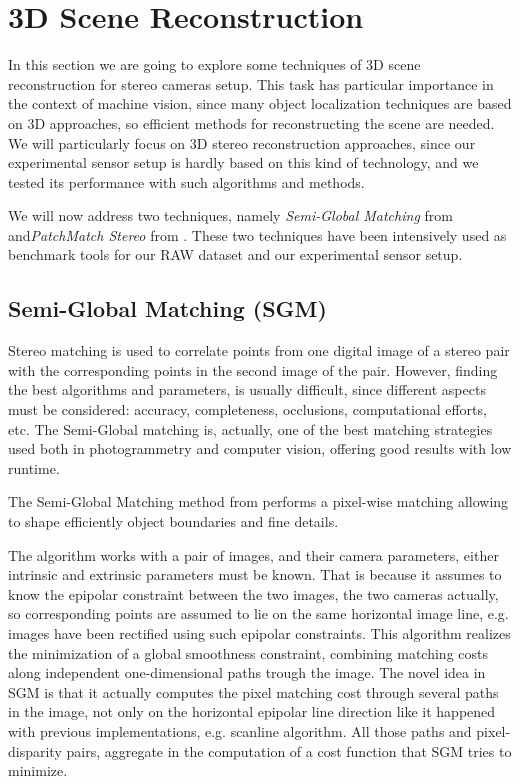 \section{3D Scene Reconstruction}\label{sec:3dreconstruction}
In this section we are going to explore some techniques of 3D scene reconstruction for stereo cameras setup. This task has particular importance in the context of machine vision, since many object localization techniques are based on 3D approaches, so efficient methods for reconstructing the scene are needed. We will particularly focus on 3D stereo reconstruction approaches, since our experimental sensor setup is hardly based on this kind of technology, and we tested its performance with such algorithms and methods.

We will now address two techniques, namely \emph{Semi-Global Matching} from \cite{hirschmuller2005SemiGlobal} and\emph{PatchMatch Stereo} from \cite{bleyer2011PatchMatchStereo}. These two techniques have been intensively used as benchmark tools for our RAW dataset and our experimental sensor setup.

\subsection{Semi-Global Matching (SGM)}\label{subsec:semiglobalmatching}
Stereo matching is used to correlate points from one digital image of a stereo pair with the corresponding points in the second image of the pair. However, finding the best algorithms and parameters, is usually difficult, since different aspects must be considered: accuracy, completeness, occlusions, computational efforts, etc. The Semi-Global matching is, actually, one of the best matching strategies used both in photogrammetry and computer vision, offering good results with low runtime.

The Semi-Global Matching method from \cite{hirschmuller2005SemiGlobal} performs a pixel-wise matching allowing to shape efficiently object boundaries and fine details. 

The algorithm works with a pair of images, and their camera parameters, either intrinsic and extrinsic parameters must be known. That is because it assumes to know the epipolar constraint between the two images, the two cameras actually, so corresponding points are assumed to lie on the same horizontal image line, e.g. images have been rectified using such epipolar constraints. This algorithm realizes the minimization of a global smoothness constraint, combining matching costs along independent one-dimensional paths trough the image. The novel idea in SGM is that it actually computes the pixel matching cost through several paths in the image, not only on the horizontal epipolar line direction like it happened with previous implementations, e.g. scanline algorithm. All those paths and pixel-disparity pairs, aggregate in the computation of a cost function that SGM tries to minimize.

